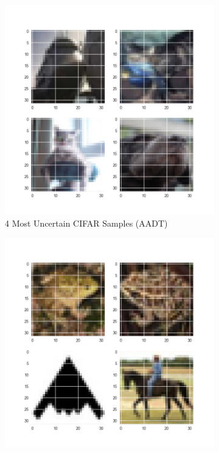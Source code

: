\begin{figure}[h!]
\hspace*{-3cm}    
\centering
\begin{subfigure}{0.7\textwidth}
  \centering
  \includegraphics[width=1\linewidth]{CIFAR_certain_Samples_D2T.png}
  \caption{4 Most Uncertain CIFAR Samples (AADT)}
  \label{fig:CIFAR_Uncertain AADT}
\end{subfigure}%
\begin{subfigure}{0.7\textwidth}
\hspace*{-1cm}   
  \centering
  \includegraphics[width=1\linewidth]{CIFAR_Uncertain_Samples_D2T.png}

\end{subfigure}
\end{figure}

